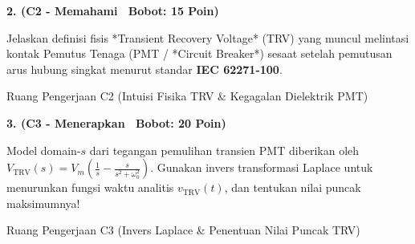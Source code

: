 \documentclass[10pt,a4paper]{article}
\begin{document}
\vspace{1mm}

\noindent\textbf{2. (C2 - Memahami \textbar\ Bobot: 15 Poin)}\par\vspace{0.5mm}
{\footnotesize Jelaskan definisi fisis *Transient Recovery Voltage* (TRV) yang muncul melintasi kontak Pemutus Tenaga (PMT / *Circuit Breaker*) sesaat setelah pemutusan arus hubung singkat menurut standar \textbf{IEC 62271-100}.}
\begin{answerbox}{Ruang Pengerjaan C2 (Intuisi Fisika TRV \& Kegagalan Dielektrik PMT)}
  \vspace{2.1cm}
\end{answerbox}

\vspace{1mm}

\noindent\textbf{3. (C3 - Menerapkan \textbar\ Bobot: 20 Poin)}\par\vspace{0.5mm}
\noindent\begin{minipage}[t]{0.60\textwidth}%
  {\footnotesize Model domain-$s$ dari tegangan pemulihan transien PMT diberikan oleh $V_{\text{TRV}}(s) = V_m \left( \frac{1}{s} - \frac{s}{s^2 + \omega_0^2} \right)$. Gunakan invers transformasi Laplace untuk menurunkan fungsi waktu analitis $v_{\text{TRV}}(t)$, dan tentukan nilai puncak maksimumnya!}%
\end{minipage}%
\hfill%
\begin{minipage}[t]{0.37\textwidth}%
  \centering
\end{minipage}\par\vspace{1mm}
\begin{answerbox}{Ruang Pengerjaan C3 (Invers Laplace \& Penentuan Nilai Puncak TRV)}
  \vspace{2.8cm}
\end{answerbox}

\newpage
\end{document}
